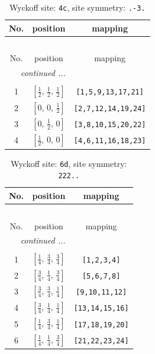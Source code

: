 \documentclass[fleqn,8pt]{jsarticle}
\begin{document}
\renewcommand{\arraystretch}{1.2}
\begin{longtable}{ccc}
\caption{Wyckoff site: {\tt 4c}, site symmetry: {\tt .-3.}}
 \\
 \hline \hline
No. & position & mapping \\ \hline \endfirsthead

\multicolumn{2}{l}{\tablename\ \thetable{}} \\
 \hline \hline
No. & position & mapping \\ \hline \endhead

 \hline \hline
\multicolumn{2}{r}{\footnotesize\it continued ...} \\ \endfoot

 \hline \hline
\multicolumn{2}{r}{} \\ \endlastfoot

1 & $\left[ \frac{1}{2},\, \frac{1}{2},\, \frac{1}{2} \right]$ & {\tt [1,5,9,13,17,21]} \\ \hline
2 & $\left[ 0,\, 0,\, \frac{1}{2} \right]$ & {\tt [2,7,12,14,19,24]} \\ \hline
3 & $\left[ 0,\, \frac{1}{2},\, 0 \right]$ & {\tt [3,8,10,15,20,22]} \\ \hline
4 & $\left[ \frac{1}{2},\, 0,\, 0 \right]$ & {\tt [4,6,11,16,18,23]} \\
\end{longtable}
\renewcommand{\arraystretch}{1.2}
\begin{longtable}{ccc}
\caption{Wyckoff site: {\tt 6d}, site symmetry: {\tt 222..}}
 \\
 \hline \hline
No. & position & mapping \\ \hline \endfirsthead

\multicolumn{2}{l}{\tablename\ \thetable{}} \\
 \hline \hline
No. & position & mapping \\ \hline \endhead

 \hline \hline
\multicolumn{2}{r}{\footnotesize\it continued ...} \\ \endfoot

 \hline \hline
\multicolumn{2}{r}{} \\ \endlastfoot

1 & $\left[ \frac{1}{4},\, \frac{3}{4},\, \frac{3}{4} \right]$ & {\tt [1,2,3,4]} \\ \hline
2 & $\left[ \frac{3}{4},\, \frac{1}{4},\, \frac{3}{4} \right]$ & {\tt [5,6,7,8]} \\ \hline
3 & $\left[ \frac{3}{4},\, \frac{3}{4},\, \frac{1}{4} \right]$ & {\tt [9,10,11,12]} \\ \hline
4 & $\left[ \frac{3}{4},\, \frac{1}{4},\, \frac{1}{4} \right]$ & {\tt [13,14,15,16]} \\ \hline
5 & $\left[ \frac{1}{4},\, \frac{3}{4},\, \frac{1}{4} \right]$ & {\tt [17,18,19,20]} \\ \hline
6 & $\left[ \frac{1}{4},\, \frac{1}{4},\, \frac{3}{4} \right]$ & {\tt [21,22,23,24]} \\
\end{longtable}
\end{document}
